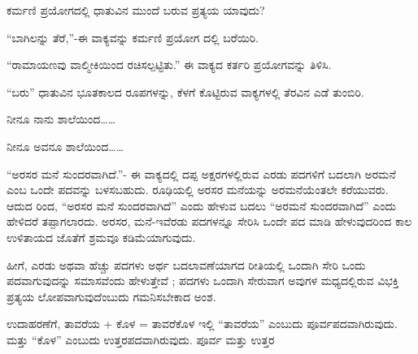\vspace{2.5pt plus 3pt minus 0.5pt}\noindent\hspace*{1.2em}\hspace{0.55em}ಕರ್ಮಣಿ ಪ್ರಯೋಗದಲ್ಲಿ ಧಾತುವಿನ ಮುಂದೆ ಬರುವ ಪ್ರತ್ಯಯ ಯಾವುದು?\par

\vspace{2.5pt plus 3pt minus 0.5pt}\noindent\hspace*{1.2em}\hspace{0.55em}“ಬಾಗಿಲನ್ನು ತೆರೆ,”-ಈ ವಾಕ್ಯವನ್ನು ಕರ್ಮಣಿ ಪ್ರಯೋಗ ದಲ್ಲಿ ಬರೆಯಿರಿ.\par

\vspace{2.5pt plus 3pt minus 0.5pt}\noindent\hspace*{1.2em}\hspace{0.55em}“ರಾಮಾಯಣವು ವಾಲ್ಮೀಕಿಯಿಂದ ರಚಿಸಲ್ಪಟ್ಟಿತು.” ಈ ವಾಕ್ಯದ ಕರ್ತರಿ ಪ್ರಯೋಗವನ್ನು ತಿಳಿಸಿ.\par

\vspace{2.5pt plus 3pt minus 0.5pt}\noindent\hspace*{1.2em}\hspace{0.55em}“ಬರು” ಧಾತುವಿನ ಭೂತಕಾಲದ ರೂಪಗಳನ್ನು, ಕೆಳಗೆ ಕೊಟ್ಟಿರುವ ವಾಕ್ಯಗಳಲ್ಲಿ ತೆರವಿನ ಎಡೆ ತುಂಬಿರಿ.\par

\vspace{2.5pt plus 3pt minus 0.5pt}\noindent\hspace*{1.2em}\kbvnum{{[}ಅ{]}}\hspace{0.55em}ನೀನೂ ನಾನು ಶಾಲೆಯಿಂದ……\par

\vspace{2.5pt plus 3pt minus 0.5pt}\noindent\hspace*{1.2em}\kbvnum{{[}ಬ{]}}\hspace{0.55em}ನೀನೂ ಅವನೂ ಶಾಲೆಯಿಂದ……\par


\indent “ಅರಸರ ಮನೆ ಸುಂದರವಾಗಿದೆ.”- ಈ ವಾಕ್ಯದಲ್ಲಿ ದಪ್ಪ ಅಕ್ಷರಗಳಲ್ಲಿರುವ ಎರಡು ಪದಗಳಿಗೆ ಬದಲಾಗಿ ಅರಮನೆ ಎಂಬ ಒಂದೇ ಪದವನ್ನು ಬಳಸಬಹುದು. ರೂಢಿಯಲ್ಲಿ ಅರಸರ ಮನೆಯನ್ನು ಅರಮನೆಯೆಂತಲೇ ಕರೆಯುವರು. ಆದುದ ರಿಂದ, “ಅರಸರ ಮನೆ ಸುಂದರವಾಗಿದೆ” ಎಂದು ಹೇಳುವ ಬದಲು “ಅರಮನೆ ಸುಂದರವಾಗಿದೆ” ಎಂದು ಹೇಳಿದರೆ ತಪ್ಪಾಗಲಾರದು. ಅರಸರ, ಮನೆ-ಇವೆರಡು ಪದಗಳನ್ನೂ ಸೇರಿಸಿ ಒಂದೇ ಪದ ಮಾಡಿ ಹೇಳುವುದರಿಂದ ಕಾಲ ಉಳಿತಾಯದ ಜೊತೆಗೆ ಶ್ರಮವೂ ಕಡಿಮೆಯಾಗುವುದು.\par

\indent ಹೀಗೆ, ಎರಡು ಅಥವಾ ಹೆಚ್ಚು ಪದಗಳು ಅರ್ಥ ಬದಲಾವಣೆಯಾಗದ ರೀತಿಯಲ್ಲಿ ಒಂದಾಗಿ ಸೇರಿ ಒಂದು ಪದವಾಗುವುದನ್ನು ಸಮಾಸವೆಂದು ಹೇಳುತ್ತೇವೆ ; ಪದಗಳು ಒಂದಾಗಿ ಸೇರುವಾಗ ಅವುಗಳ ಮಧ್ಯದಲ್ಲಿರುವ ವಿಭಕ್ತಿ ಪ್ರತ್ಯಯ ಲೋಪವಾಗುವುದೆಂಬುದು ಗಮನಿಸಬೇಕಾದ ಅಂಶ.\par

\indent ಉದಾಹರಣೆಗೆ, ತಾವರೆಯ + ಕೊಳ = ತಾವರೆಕೊಳ ಇಲ್ಲಿ “ತಾವರೆಯ” ಎಂಬುದು ಪೂರ್ವಪದವಾಗಿರುವುದು. ಮತ್ತು “ಕೊಳ” ಎಂಬುದು ಉತ್ತರಪದವಾಗಿರುವುದು. ಪೂರ್ವ ಮತ್ತು ಉತ್ತರ\kbvcontinues
